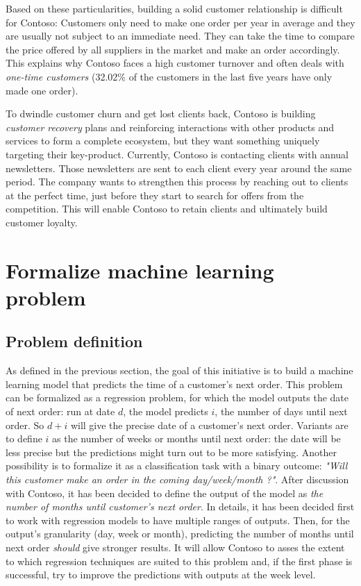  Based on these particularities, building a solid customer relationship is difficult for Contoso: Customers only need to make one order per year in average and they are usually not subject to an immediate need. They can take the time to compare the price offered by all suppliers in the market and make an order accordingly. This explains why Contoso faces a high customer turnover and often deals with \textit{one-time customers} (32.02\% of the customers in the last five years have only made one order).
 
 To dwindle customer churn and get lost clients back, Contoso is building \textit{customer recovery} plans and reinforcing interactions with other products and services to form a complete ecosystem, but they want something uniquely targeting their key-product. Currently, Contoso is contacting clients with annual newsletters. Those newsletters are sent to each client every year around the same period. The company wants to strengthen this process by reaching out to clients at the perfect time, just before they start to search for offers from the competition. This will enable Contoso to retain clients and ultimately build customer loyalty.
 
 
\section{Formalize machine learning problem} \label{sec:ml-metrics}


\subsection{Problem definition}
As defined in the previous section, the goal of this initiative is to build a machine learning model that predicts the time of a customer's next order. This problem can be formalized as a regression problem, for which the model outputs the date of next order: run at date $d$, the model predicts $i$, the number of days until next order. So $d+i$ will give the precise date of a customer's next order. Variants are to define $i$ as the number of weeks or months until next order: the date will be less precise but the predictions might turn out to be more satisfying. Another possibility is to formalize it as a classification task with a binary outcome: \textit{"Will this customer make an order in the coming day/week/month ?"}. After discussion with Contoso, it has been decided to define the output of the model as \textit{the number of months until customer's next order}. In details, it has been decided first to work with regression models to have multiple ranges of outputs. Then, for the output's granularity (day, week or month), predicting the number of months until next order \textit{should} give stronger results. It will allow Contoso to asses the extent to which regression techniques are suited to this problem and, if the first phase is successful, try to improve the predictions with outputs at the week level.



